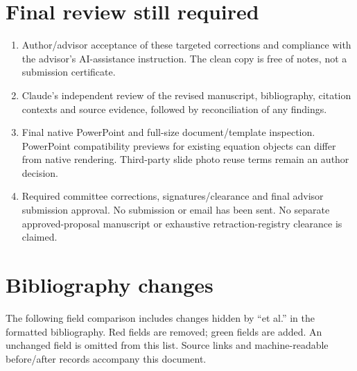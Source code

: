\section*{Final review still required}
\begin{enumerate}
\item Author/advisor acceptance of these targeted corrections and compliance with the advisor's AI-assistance instruction. The clean copy is free of notes, not a submission certificate.
\item Claude's independent review of the revised manuscript, bibliography, citation contexts and source evidence, followed by reconciliation of any findings.
\item Final native PowerPoint and full-size document/template inspection. PowerPoint compatibility previews for existing equation objects can differ from native rendering. Third-party slide photo reuse terms remain an author decision.
\item Required committee corrections, signatures/clearance and final advisor submission approval. No submission or email has been sent. No separate approved-proposal manuscript or exhaustive retraction-registry clearance is claimed.
\end{enumerate}
\section*{Bibliography changes}
The following field comparison includes changes hidden by ``et al.'' in the formatted bibliography. Red fields are removed; green fields are added. An unchanged field is omitted from this list. Source links and machine-readable before/after records accompany this document.
\begingroup\singlespacing

